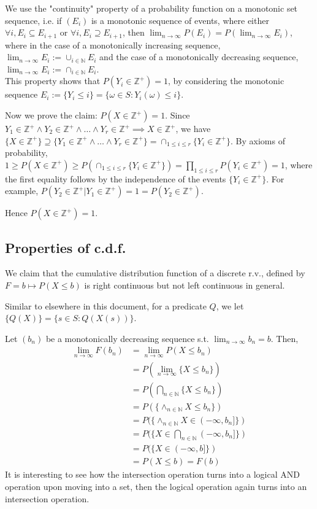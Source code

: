 \documentclass{article}
\begin{document}
We use the "continuity" property of a probability function on a monotonic set sequence, i.e. if $(E_i)$ is a monotonic sequence of events, where either $\forall i, E_i\subseteq E_{i+1}$ or $\forall i, E_i\supseteq E_{i+1}$, then $\lim_{n\rightarrow \infty}P(E_i) = P(\lim_{n\rightarrow \infty}E_i)$, where in the case of a monotonically increasing sequence, $\lim_{n\rightarrow \infty}E_i:=\cup_{i\in \mathbb{N}} E_i$ and the case of a monotonically decreasing sequence, $\lim_{n\rightarrow \infty}E_i:=\cap_{i\in \mathbb{N}} E_i$.\\
This property shows that $P(Y_i\in \mathbb{Z}^+) = 1$, by considering the monotonic sequence $E_i := \{Y_i\leq i\} = \{\omega \in S: Y_i(\omega) \leq i\}$.

Now we prove the claim: $P(X\in \mathbb{Z}^+) = 1$. Since $Y_1 \in \mathbb{Z}^+\land Y_2\in \mathbb{Z}^+\land \dots \land Y_r\in \mathbb{Z}^+\implies X\in \mathbb{Z}^+$, we have $\{X\in \mathbb{Z}^+\}\supseteq \{Y_1 \in \mathbb{Z}^+\land \dots \land Y_r\in \mathbb{Z}^+\} = \cap_{1\leq i\leq r} \{Y_i\in \mathbb{Z}^+\}$. By axioms of probability, $1\geq P(X\in \mathbb{Z}^+)\geq P(\cap_{1\leq i\leq r} \{Y_i\in \mathbb{Z}^+\}) = \prod_{1\leq i\leq r}P(Y_i\in \mathbb{Z}^+)=1$, where the first equality follows by the independence of the events $\{Y_i\in \mathbb{Z}^+\}$. For example, $P(Y_2\in \mathbb{Z}^+ | Y_1\in \mathbb{Z}^+) = 1 = P(Y_2\in \mathbb{Z}^+)$.

Hence $P(X\in \mathbb{Z}^+) = 1$.

\subsection{Properties of c.d.f.} We claim that the cumulative distribution function of a discrete r.v., defined by $F = b\mapsto P(X\leq b)$ is right continuous but not left continuous in general.

Similar to elsewhere in this document, for a predicate $Q$, we let $\{Q(X)\} = \{s\in S : Q(X(s))\}$.

Let $(b_n)$ be a monotonically decreasing sequence s.t. $\lim_{n\rightarrow \infty}b_n = b$. Then,
\begin{align*}
	\lim_{n\rightarrow \infty}F(b_n) &= \lim_{n\rightarrow \infty}P(X\leq b_n)\\
	&= P(\lim_{n\rightarrow \infty}\{X\leq b_n\})\\
	&= P(\bigcap_{n\in \mathbb{N}}\{X\leq b_n\})\\
	&= P(\{\land_{n\in \mathbb{N}}X\leq b_n\})\\
	&= P(\{\land_{n\in \mathbb{N}}X\in (-\infty, b_n]\})\\
	&= P(\{X\in \bigcap_{n\in \mathbb{N}}(-\infty, b_n]\})\\
	&= P(\{X\in (-\infty, b]\})\\
	&= P(X\leq b) = F(b)
\end{align*}
It is interesting to see how the intersection operation turns into a logical AND operation upon moving into a set, then the logical operation again turns into an intersection operation.
\end{document}
